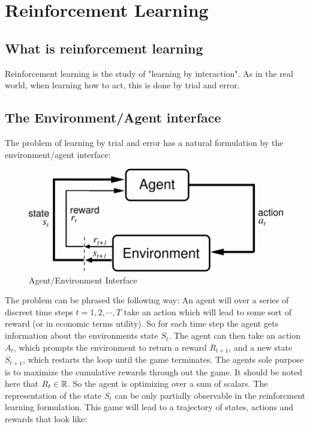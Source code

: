 \section{Reinforcement Learning}


\subsection{What is reinforcement learning}

Reinforcement learning is the study of "learning by interaction". As in the real world, when learning how to act, this is done by trial and error.

\subsection{The Environment/Agent interface}

The problem of learning by trial and error has a natural formulation by the environment/agent interface:

\begin{figure}
    \centering
    \includegraphics[scale=0.5]{figures/agent_environment_interface.png}
    \caption{Agent/Environment Interface}
    \label{fig:agent_enviroment_interface}
\end{figure}

The problem can be phrased the following way: An agent will over a series of discreet time steps $t=1, 2, \cdots, T$ take an action which will lead to some sort of reward (or in economic terms utility). So for each time step the agent gets information about the environments state $S_t$. The agent can then take an action $A_t$, which prompts the environment to return a reward $R_{t+1}$, and a new state $S_{t+1}$, which restarts the loop until the game terminates. The agents sole purpose is to maximize the cumulative rewards through out the game. It should be noted here that $R_t \in \mathbb{R}$. So the agent is optimizing over a sum of scalars. The representation of the state $S_t$ can be only partially observable in the reinforcment learning formulation. This game will lead to a trajectory of states, actions and rewards that look like:

